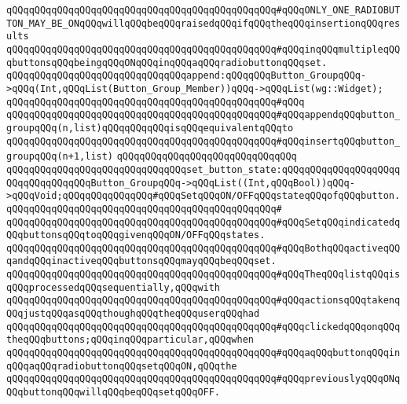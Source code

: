 \verb|qQQqqQQqqQQqqQQqqQQqqQQqqQQqqQQqqQQqqQQqqQQqqQQq#qQQqONLY_ONE_RADIOBUTTON_MAY_BE_ONqQQqwillqQQqbeqQQqraisedqQQqifqQQqtheqQQqinsertionqQQqresults|\newline
\verb|qQQqqQQqqQQqqQQqqQQqqQQqqQQqqQQqqQQqqQQqqQQqqQQq#qQQqinqQQqmultipleqQQqbuttonsqQQqbeingqQQqONqQQqinqQQqaqQQqradiobuttonqQQqset.|\newline
\newline
\verb|qQQqqQQqqQQqqQQqqQQqqQQqqQQqqQQqappend:qQQqqQQqButton_GroupqQQq->qQQq(Int,qQQqList(Button_Group_Member))qQQq->qQQqList(wg::Widget);|\newline
\verb|qQQqqQQqqQQqqQQqqQQqqQQqqQQqqQQqqQQqqQQqqQQqqQQq#qQQq|\newline
\verb|qQQqqQQqqQQqqQQqqQQqqQQqqQQqqQQqqQQqqQQqqQQqqQQq#qQQqappendqQQqbutton_groupqQQq(n,list)qQQqqQQqqQQqisqQQqequivalentqQQqto|\newline
\verb|qQQqqQQqqQQqqQQqqQQqqQQqqQQqqQQqqQQqqQQqqQQqqQQq#qQQqinsertqQQqbutton_groupqQQq(n+1,list)|\newline
\verb|qQQqqQQqqQQqqQQqqQQqqQQqqQQqqQQq|\newline
\verb|qQQqqQQqqQQqqQQqqQQqqQQqqQQqqQQqset_button_state:qQQqqQQqqQQqqQQqqQQqqQQqqQQqqQQqqQQqButton_GroupqQQq->qQQqList((Int,qQQqBool))qQQq->qQQqVoid;qQQqqQQqqQQqqQQq#qQQqSetqQQqON/OFFqQQqstateqQQqofqQQqbutton.|\newline
\verb|qQQqqQQqqQQqqQQqqQQqqQQqqQQqqQQqqQQqqQQqqQQqqQQq#|\newline
\verb|qQQqqQQqqQQqqQQqqQQqqQQqqQQqqQQqqQQqqQQqqQQqqQQq#qQQqSetqQQqindicatedqQQqbuttonsqQQqtoqQQqgivenqQQqON/OFFqQQqstates.|\newline
\verb|qQQqqQQqqQQqqQQqqQQqqQQqqQQqqQQqqQQqqQQqqQQqqQQq#qQQqBothqQQqactiveqQQqandqQQqinactiveqQQqbuttonsqQQqmayqQQqbeqQQqset.|\newline
\verb|qQQqqQQqqQQqqQQqqQQqqQQqqQQqqQQqqQQqqQQqqQQqqQQq#qQQqTheqQQqlistqQQqisqQQqprocessedqQQqsequentially,qQQqwith|\newline
\verb|qQQqqQQqqQQqqQQqqQQqqQQqqQQqqQQqqQQqqQQqqQQqqQQq#qQQqactionsqQQqtakenqQQqjustqQQqasqQQqthoughqQQqtheqQQquserqQQqhad|\newline
\verb|qQQqqQQqqQQqqQQqqQQqqQQqqQQqqQQqqQQqqQQqqQQqqQQq#qQQqclickedqQQqonqQQqtheqQQqbuttons;qQQqinqQQqparticular,qQQqwhen|\newline
\verb|qQQqqQQqqQQqqQQqqQQqqQQqqQQqqQQqqQQqqQQqqQQqqQQq#qQQqaqQQqbuttonqQQqinqQQqaqQQqradiobuttonqQQqsetqQQqON,qQQqthe|\newline
\verb|qQQqqQQqqQQqqQQqqQQqqQQqqQQqqQQqqQQqqQQqqQQqqQQq#qQQqpreviouslyqQQqONqQQqbuttonqQQqwillqQQqbeqQQqsetqQQqOFF.|\newline

